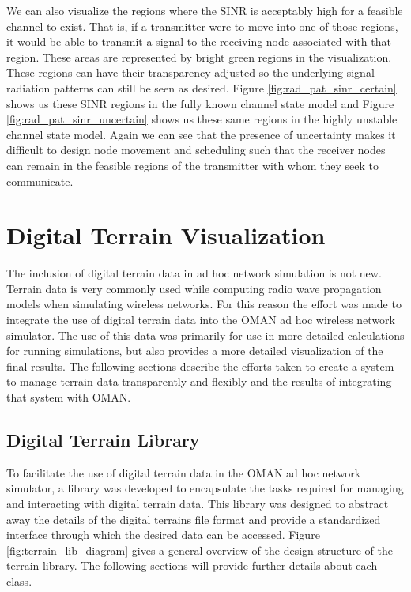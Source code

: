We can also visualize the regions where the SINR is acceptably high for a feasible channel to exist.  That is, if a transmitter were to move into one of those regions, it would be able to transmit a signal to the receiving node associated with that region.  These areas are represented by bright green regions in the visualization.  These regions can have their transparency adjusted so the underlying signal radiation patterns can still be seen as desired.  Figure \ref{fig:rad_pat_sinr_certain} shows us these SINR regions in the fully known channel state model and Figure \ref{fig:rad_pat_sinr_uncertain} shows us these same regions in the highly unstable channel state model. Again we can see that the presence of uncertainty makes it difficult to design node movement and scheduling such that the receiver nodes can remain in the feasible regions of the transmitter with whom they seek to communicate.


\section{Digital Terrain Visualization}
The inclusion of digital terrain data in ad hoc network simulation is not new.  Terrain data is very commonly used while computing radio wave propagation models when simulating wireless networks.  For this reason the effort was made to integrate the use of digital terrain data into the OMAN ad hoc wireless network simulator.  The use of this data was primarily for use in more detailed calculations for running simulations, but also provides a more detailed visualization of the final results.  The following sections describe the efforts taken to create a system to manage terrain data transparently and flexibly and the results of integrating that system with OMAN.

\subsection{Digital Terrain Library}
To facilitate the use of digital terrain data in the OMAN ad hoc network simulator, a library was developed to encapsulate the tasks required for managing and interacting with digital terrain data.  This library was designed to abstract away the details of the digital terrains file format and provide a standardized interface through which the desired data can be accessed.  Figure \ref{fig:terrain_lib_diagram} gives a general overview of the design structure of the terrain library.  The following sections will provide further details about each class.


